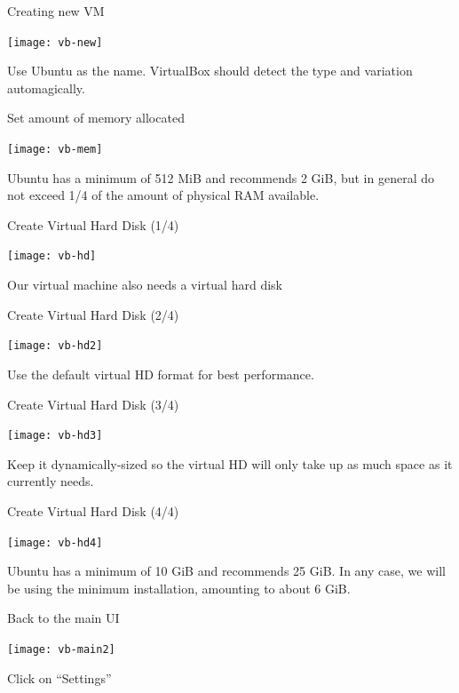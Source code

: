 \documentclass[12pt]{beamer}
\begin{document}
\begin{frame}{Creating new VM}
  \begin{center}
    \texttt{[image: vb-new]}
  \end{center}
  Use Ubuntu as the name. VirtualBox should detect the type and variation automagically.
\end{frame}

\begin{frame}{Set amount of memory allocated}
  \begin{center}
    \texttt{[image: vb-mem]}
  \end{center}
  Ubuntu has a minimum of 512 MiB and recommends 2 GiB, but in general do not exceed 1/4 of the amount of physical RAM available.
\end{frame}

\begin{frame}{Create Virtual Hard Disk (1/4)}
  \begin{center}
    \texttt{[image: vb-hd]}
  \end{center}
  Our virtual machine also needs a virtual hard disk
\end{frame}

\begin{frame}{Create Virtual Hard Disk (2/4)}
  \begin{center}
    \texttt{[image: vb-hd2]}
  \end{center}
  Use the default virtual HD format for best performance.
\end{frame}

\begin{frame}{Create Virtual Hard Disk (3/4)}
  \begin{center}
    \texttt{[image: vb-hd3]}
  \end{center}
  Keep it dynamically-sized so the virtual HD will only take up as much space as it currently needs.
\end{frame}

\begin{frame}{Create Virtual Hard Disk (4/4)}
  \begin{center}
    \texttt{[image: vb-hd4]}
  \end{center}
  Ubuntu has a minimum of 10 GiB and recommends 25 GiB. In any case, we will be using the minimum installation, amounting to about 6 GiB.
\end{frame}

\begin{frame}{Back to the main UI}
  \begin{center}
    \texttt{[image: vb-main2]}
  \end{center}
  Click on ``Settings''
\end{frame}
\end{document}
